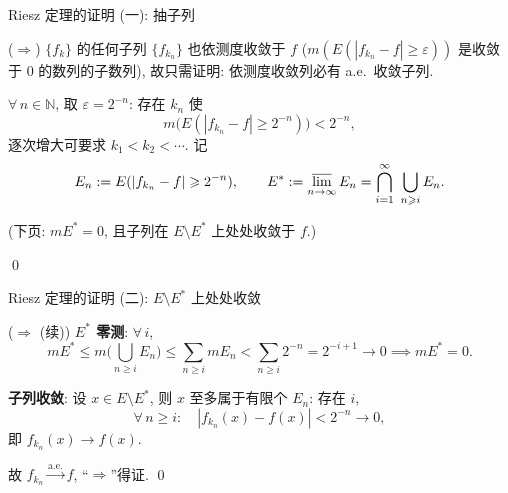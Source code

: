
\begin{frame}{Riesz 定理的证明 (一): 抽子列}

\startproof[bg=yellow, fg=red]($\Longrightarrow$)
$\{f_k\}$ 的任何子列 $\{f_{k_n}\}$ 也依测度收敛于 $f$ ($m(E(|f_{k_n} - f| \geqslant \varepsilon))$ 是收敛于 $0$ 的数列的子数列), 故只需证明: \alert{依测度收敛列必有 a.e.\ 收敛子列}.

\pause

$\forall\, n \in \mathbb{N}$, 取 $\varepsilon = 2^{-n}$: 存在 $k_n$ 使
\[
m\big(E(|f_{k_n} - f| \geqslant 2^{-n})\big) < 2^{-n},
\]
逐次增大可要求 $k_1 < k_2 < \cdots$. 记
\[
E_n := E(|f_{k_n} - f| \geqslant 2^{-n}),
\qquad
E^* := \varlimsup_{n\to\infty} E_n = \bigcap_{i=1}^{\infty}\ \bigcup_{n \geqslant i} E_n .
\]

\pause

(下页: $mE^* = 0$, 且子列在 $E \setminus E^*$ 上处处收敛于 $f$.)

\qed

\end{frame}


\begin{frame}{Riesz 定理的证明 (二): $E \setminus E^*$ 上处处收敛}

\startproof[bg=yellow, fg=red]($\Longrightarrow$ (续))
\textbf{$E^*$ 零测}: $\forall\, i$,
\[
mE^* \leqslant m\Big(\bigcup_{n \geqslant i} E_n\Big)
\leqslant \sum_{n \geqslant i} mE_n
< \sum_{n \geqslant i} 2^{-n} = 2^{-i+1} \longrightarrow 0
\implies mE^* = 0 .
\]

\pause

\textbf{子列收敛}: 设 $x \in E \setminus E^*$, 则 $x$ 至多属于有限个 $E_n$: 存在 $i$,
\[
\forall\, n \geqslant i:\quad |f_{k_n}(x) - f(x)| < 2^{-n} \longrightarrow 0,
\]
即 $f_{k_n}(x) \to f(x)$.

\pause

故 $f_{k_n} \xrightarrow{\text{a.e.}} f$, ``$\Longrightarrow$''得证.
\qed

\end{frame}


